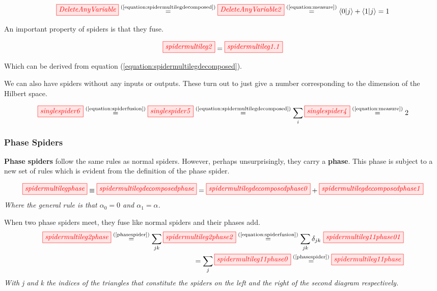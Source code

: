 \documentclass[]{article}
\newcommand{\equaltext}[1]{\ensuremath{\stackrel{\text{#1}}{=}}}
\begin{document}
\begin{equation}
\label{equation:deleteanyvariable}
 \tikzfig{DeleteAnyVariable} \equaltext{(\ref{equation:spidermultilegdecomposed})} \tikzfig{DeleteAnyVariable2} \equaltext{(\ref{equation:measure})}  \bra{0}\ket{j} + \bra{1}\ket{j} = 1
\end{equation}

An important property of spiders is that they fuse.

\begin{equation}
\label{equation:spiderfusion}
	\tikzfig{spidermultileg2} = \tikzfig{spidermultileg1.1}
\end{equation}

Which can be derived from equation (\ref{equation:spidermultilegdecomposed}).

We can also have spiders without any inputs or outputs. These turn out to just give a number corresponding to the dimension of the Hilbert space.

\begin{equation}
	\label{equation:singlespider}
	\tikzfig{singlespider6} \equaltext{(\ref{equation:spiderfusion})}
	\tikzfig{singlespider5}  \equaltext{(\ref{equation:spidermultilegdecomposed})}
	\sum\limits_i \tikzfig{singlespider4} \equaltext{(\ref{equation:measure})} 2
\end{equation}



\subsubsection{Phase Spiders}
\label{phasespiders}

\textbf{Phase spiders} follow the same rules as normal spiders. However, perhaps unsurprisingly, they carry a \textbf{phase}. This phase is subject to a new set of rules which is evident from the definition of the phase spider. 

\begin{equation}
\label{phasespider}
\tikzfig{spidermultilegphase} \equiv \tikzfig{spidermultilegdecomposedphase} = \tikzfig{spidermultilegdecomposedphase0} + \tikzfig{spidermultilegdecomposedphase1}
\end{equation}
\textit{Where the general rule is that $\alpha_0 = 0$ and $\alpha_1 = \alpha$.}

When two phase spiders meet, they fuse like normal spiders and their phases add.
\begin{equation}
\label{equation:phasespiderfusion}
\begin{split}
	\tikzfig{spidermultileg2phase} \equaltext{(\ref{phasespider})} \sum\limits_{jk} \tikzfig{spidermultileg2phase2} \equaltext{(\ref{equation:spiderfusion})}
	\sum\limits_{jk}\delta_{jk}~ \tikzfig{spidermultileg11phase01}\\
	=
	 \sum\limits_{j} \tikzfig{spidermultileg11phase0} \equaltext{(\ref{phasespider})} \tikzfig{spidermultileg11phase}
\end{split}
\end{equation}
\textit{With j and k the indices of the triangles that constitute the spiders on the left and the right of the second diagram respectively.}
\end{document}
